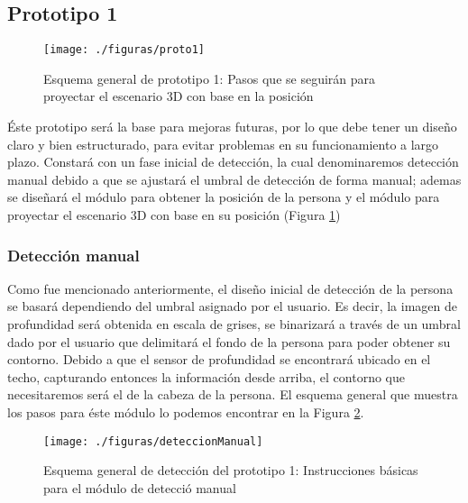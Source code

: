 \documentclass[a4paper,openright,12pt]{report}
\begin{document}
\subsection{Prototipo 1}
\begin{figure}[th]
	\centering
	\texttt{[image: ./figuras/proto1]}
	\caption[Esquema general de prototipo 1]{Esquema general de prototipo 1: Pasos que se seguirán para proyectar el escenario 3D con base en la posición} \label{fig:proto1}
\end{figure}
Éste prototipo será la base para mejoras futuras, por lo que debe tener un diseño claro y bien estructurado, para evitar problemas en su funcionamiento a largo plazo. Constará con un fase inicial de detección, la cual denominaremos detección manual debido a que se ajustará el umbral de detección de forma manual; ademas se diseñará el módulo para obtener la posición de la persona y el módulo para proyectar el escenario 3D con base en su posición (Figura \ref{fig:proto1})

\subsubsection{Detección manual}
Como fue mencionado anteriormente, el diseño inicial de detección de la persona se basará dependiendo del umbral asignado por el usuario. Es decir, la imagen de profundidad será obtenida en escala de grises, se binarizará a través de un umbral dado por el usuario que delimitará el fondo de la persona para poder obtener su contorno. Debido a que el sensor de profundidad se encontrará ubicado en el techo, capturando entonces la información desde arriba, el contorno que necesitaremos será el de la cabeza de la persona. El esquema general que muestra los pasos para éste módulo lo podemos encontrar en la Figura \ref{fig:deteccManual}.
\begin{figure}[th]
	\centering
	\texttt{[image: ./figuras/deteccionManual]}
	\caption[Esquema general de Detección del prototipo 1]{Esquema general de detección del prototipo 1: Instrucciones básicas para el módulo de detecció manual} \label{fig:deteccManual}
\end{figure}
\end{document}
